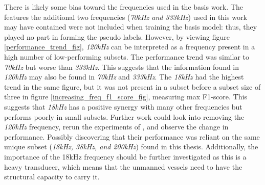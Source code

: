     
    
    
    
    
    
    
    
    There is likely some bias toward the frequencies used in the basis work. The features the additional two frequencies (\textit{70kHz and 333kHz}) used in this work may have contained were not included when training the basis model: thus, they played no part in forming the pseudo labels.  However, by viewing figure \ref{performance_trend_fig}, \textit{120kHz} can be interpreted as a frequency present in a high number of low-performing subsets. The performance trend was similar to \textit{70kHz} but worse than \textit{333kHz}. This suggests that the information found in \textit{120kHz} may also be found in \textit{70kHz} and \textit{333kHz}. The \textit{18kHz} had the highest trend in the same figure, but it was not present in a subset before a subset size of three in figure \ref{increasing_freq_f1_score_fig}, measuring max F1-score. This suggests that \textit{18kHz} has a positive synergy with many other frequencies but performs poorly in small subsets. Further work could look into removing the \textit{120kHz} frequency, rerun the experiments of \citeauthor{brautaset2020acoustic} \cite{brautaset2020acoustic}, and observe the change in performance. Possibly discovering that their performance was reliant on the same unique subset (\textit{18kHz, 38kHz, and 200kHz}) found in this thesis. Additionally, the importance of the 18kHz frequency should be further investigated as this is a heavy transducer, which means that the unmanned vessels need to have the structural capacity to carry it.

